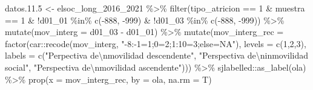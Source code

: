\documentclass[
  12pt,
]{book}
\newenvironment{Shaded}{\begin{snugshade}}{\end{snugshade}}
\newcommand{\AttributeTok}[1]{\textcolor[rgb]{0.77,0.63,0.00}{#1}}
\newcommand{\DecValTok}[1]{\textcolor[rgb]{0.00,0.00,0.81}{#1}}
\newcommand{\FloatTok}[1]{\textcolor[rgb]{0.00,0.00,0.81}{#1}}
\newcommand{\FunctionTok}[1]{\textcolor[rgb]{0.00,0.00,0.00}{#1}}
\newcommand{\NormalTok}[1]{#1}
\newcommand{\OtherTok}[1]{\textcolor[rgb]{0.56,0.35,0.01}{#1}}
\newcommand{\SpecialCharTok}[1]{\textcolor[rgb]{0.00,0.00,0.00}{#1}}
\newcommand{\StringTok}[1]{\textcolor[rgb]{0.31,0.60,0.02}{#1}}
\begin{document}
\begin{Shaded}
\begin{Highlighting}[]
\NormalTok{datos.}\FloatTok{11.5} \OtherTok{\textless{}{-}}\NormalTok{ elsoc\_long\_2016\_2021 }\SpecialCharTok{\%\textgreater{}\%} 
  \FunctionTok{filter}\NormalTok{(tipo\_atricion }\SpecialCharTok{==} \DecValTok{1} \SpecialCharTok{\&}\NormalTok{ muestra }\SpecialCharTok{==} \DecValTok{1} \SpecialCharTok{\&} 
         \SpecialCharTok{!}\NormalTok{d01\_01 }\SpecialCharTok{\%in\%} \FunctionTok{c}\NormalTok{(}\SpecialCharTok{{-}}\DecValTok{888}\NormalTok{, }\SpecialCharTok{{-}}\DecValTok{999}\NormalTok{) }\SpecialCharTok{\&} \SpecialCharTok{!}\NormalTok{d01\_03 }\SpecialCharTok{\%in\%} \FunctionTok{c}\NormalTok{(}\SpecialCharTok{{-}}\DecValTok{888}\NormalTok{, }\SpecialCharTok{{-}}\DecValTok{999}\NormalTok{)) }\SpecialCharTok{\%\textgreater{}\%} 
  \FunctionTok{mutate}\NormalTok{(}\AttributeTok{mov\_interg =}\NormalTok{ d01\_03 }\SpecialCharTok{{-}}\NormalTok{ d01\_01) }\SpecialCharTok{\%\textgreater{}\%} 
  \FunctionTok{mutate}\NormalTok{(}\AttributeTok{mov\_interg\_rec =} \FunctionTok{factor}\NormalTok{(car}\SpecialCharTok{::}\FunctionTok{recode}\NormalTok{(mov\_interg, }\StringTok{"{-}8:{-}1=1;0=2;1:10=3;else=NA"}\NormalTok{), }
                            \AttributeTok{levels =} \FunctionTok{c}\NormalTok{(}\DecValTok{1}\NormalTok{,}\DecValTok{2}\NormalTok{,}\DecValTok{3}\NormalTok{), }
                            \AttributeTok{labels =} \FunctionTok{c}\NormalTok{(}\StringTok{"Perpectiva de}\SpecialCharTok{\textbackslash{}n}\StringTok{movilidad descendente"}\NormalTok{, }\StringTok{"Perspectiva de}\SpecialCharTok{\textbackslash{}n}\StringTok{inmovilidad social"}\NormalTok{,}
                                       \StringTok{"Perspectiva de}\SpecialCharTok{\textbackslash{}n}\StringTok{movilidad ascendente"}\NormalTok{))) }\SpecialCharTok{\%\textgreater{}\%} 
\NormalTok{  sjlabelled}\SpecialCharTok{::}\FunctionTok{as\_label}\NormalTok{(ola) }\SpecialCharTok{\%\textgreater{}\%} 
  \FunctionTok{prop}\NormalTok{(}\AttributeTok{x =}\NormalTok{ mov\_interg\_rec, }\AttributeTok{by =}\NormalTok{ ola, }\AttributeTok{na.rm =}\NormalTok{ T)}


\end{Highlighting}
\end{Shaded}
\end{document}
